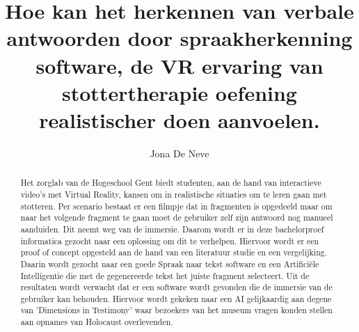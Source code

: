 \documentclass{hogent-article}
\title{Hoe kan het herkennen van verbale antwoorden door spraakherkenning software, de VR ervaring van stottertherapie oefening realistischer doen aanvoelen.}
\author{Jona De Neve}
\begin{document}
\begin{abstract}

Het zorglab van de Hogeschool Gent biedt studenten, aan de hand van interactieve video's met Virtual Reality, kansen om in realistische situaties om te leren gaan met stotteren. Per scenario bestaat er een filmpje dat in fragmenten is opgedeeld maar om naar het volgende fragment te gaan moet de gebruiker zelf zijn antwoord nog manueel aanduiden. Dit neemt weg van de immersie. Daarom wordt er in deze bachelorproef informatica gezocht naar een oplossing om dit te verhelpen. Hiervoor wordt er een proof of concept opgesteld  aan de hand van een literatuur studie en een vergelijking. Daarin wordt gezocht naar een goede Spraak naar tekst software en een Artificiële Intelligentie die met de gegenereerde tekst het juiste fragment selecteert. Uit de resultaten wordt verwacht dat er een software wordt gevonden die de immersie van de gebruiker kan behouden. Hiervoor wordt gekeken naar een AI gelijkaardig aan degene van 'Dimensions in Testimony' waar bezoekers van het museum vragen konden stellen aan opnames van Holocaust overlevenden.

\end{abstract}

\tableofcontents



\printbibliography[heading=bibintoc]
\end{document}
